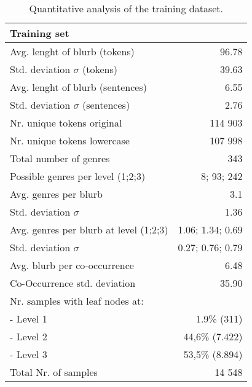 \documentclass[11pt,a4paper]{article}
\begin{document}
\begin{table}
\small
\begin{center}
\begin{tabular}{|l|r|}
\hline\centering\textbf{Training set}  &                        \\
\hline
Avg. lenght of blurb (tokens)              &  96.78             \\
Std. deviation $\sigma$ (tokens)           &  39.63             \\
Avg. lenght of blurb (sentences)           &  6.55              \\
Std. deviation $\sigma$ (sentences)        &  2.76              \\
\hline
Nr. unique tokens original                 &  114 903           \\
Nr. unique tokens lowercase                &  107 998           \\
\hline
Total number of genres                     &  343               \\
Possible genres per level (1;2;3)          &  8; 93; 242        \\
Avg. genres per blurb                      &  3.1               \\
Std. deviation $\sigma$                    &  1.36              \\
Avg. genres per blurb at level (1;2;3)     &  1.06; 1.34; 0.69  \\
Std. deviation $\sigma$                    &  0.27; 0.76; 0.79  \\
\hline
Avg. blurb per co-occurrence               &  6.48              \\
Co-Occurrence std. deviation               & 35.90              \\
\hline
Nr. samples with leaf nodes at:            &                    \\
 - Level 1                                 & 1.9\% (311)        \\
 - Level 2                                 & 44,6\% (7.422)     \\
 - Level 3                                 & 53,5\% (8.894)     \\
 \hline
 Total Nr. of samples                      & 14 548             \\
\hline
\end{tabular}
\end{center}
\caption{\label{quantitivy-analysis-train}Quantitative analysis of the training dataset.}
\end{table}
\end{document}
